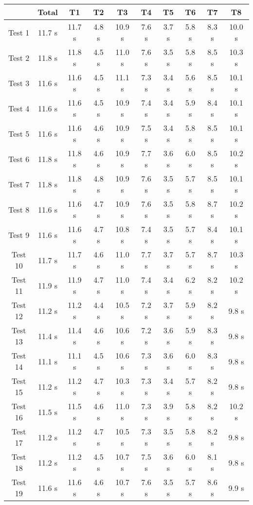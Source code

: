 \documentclass[12pt]{article}
\begin{document}
\begin{tabular}{ | c | c | c | c | c | c | c | c | c | c | }
  \hline	 & Total & T1 & T2 & T3 & T4 & T5 & T6 & T7 & T8 \\ \hline 
  Test 1& 11.7 s& 11.7 s& 4.8 s& 10.9 s& 7.6 s& 3.7 s& 5.8 s& 8.3 s& 10.0 s\\ \hline 
  Test 2& 11.8 s& 11.8 s& 4.5 s& 11.0 s& 7.6 s& 3.5 s& 5.8 s& 8.5 s& 10.3 s\\ \hline 
  Test 3& 11.6 s& 11.6 s& 4.5 s& 11.1 s& 7.3 s& 3.4 s& 5.6 s& 8.5 s& 10.1 s\\ \hline 
  Test 4& 11.6 s& 11.6 s& 4.5 s& 10.9 s& 7.4 s& 3.4 s& 5.9 s& 8.4 s& 10.1 s\\ \hline 
  Test 5& 11.6 s& 11.6 s& 4.6 s& 10.9 s& 7.5 s& 3.4 s& 5.8 s& 8.5 s& 10.1 s\\ \hline 
  Test 6& 11.8 s& 11.8 s& 4.6 s& 10.9 s& 7.7 s& 3.6 s& 6.0 s& 8.5 s& 10.2 s\\ \hline 
  Test 7& 11.8 s& 11.8 s& 4.8 s& 10.9 s& 7.6 s& 3.5 s& 5.7 s& 8.5 s& 10.1 s\\ \hline 
  Test 8& 11.6 s& 11.6 s& 4.7 s& 10.9 s& 7.6 s& 3.5 s& 5.8 s& 8.7 s& 10.2 s\\ \hline 
  Test 9& 11.6 s& 11.6 s& 4.7 s& 10.8 s& 7.4 s& 3.5 s& 5.7 s& 8.4 s& 10.1 s\\ \hline 
  Test 10& 11.7 s& 11.7 s& 4.6 s& 11.0 s& 7.7 s& 3.7 s& 5.7 s& 8.7 s& 10.3 s\\ \hline 
  Test 11& 11.9 s& 11.9 s& 4.7 s& 11.0 s& 7.4 s& 3.4 s& 6.2 s& 8.2 s& 10.2 s\\ \hline 
  Test 12& 11.2 s& 11.2 s& 4.4 s& 10.5 s& 7.2 s& 3.7 s& 5.9 s& 8.2 s& 9.8 s\\ \hline 
  Test 13& 11.4 s& 11.4 s& 4.6 s& 10.6 s& 7.2 s& 3.6 s& 5.9 s& 8.3 s& 9.8 s\\ \hline 
  Test 14& 11.1 s& 11.1 s& 4.5 s& 10.6 s& 7.3 s& 3.6 s& 6.0 s& 8.3 s& 9.8 s\\ \hline 
  Test 15& 11.2 s& 11.2 s& 4.7 s& 10.3 s& 7.3 s& 3.4 s& 5.7 s& 8.2 s& 9.8 s\\ \hline 
  Test 16& 11.5 s& 11.5 s& 4.6 s& 11.0 s& 7.3 s& 3.9 s& 5.8 s& 8.2 s& 10.2 s\\ \hline 
  Test 17& 11.2 s& 11.2 s& 4.7 s& 10.5 s& 7.3 s& 3.5 s& 5.8 s& 8.2 s& 9.8 s\\ \hline 
  Test 18& 11.2 s& 11.2 s& 4.5 s& 10.7 s& 7.5 s& 3.6 s& 6.0 s& 8.1 s& 9.8 s\\ \hline 
  Test 19& 11.6 s& 11.6 s& 4.6 s& 10.7 s& 7.6 s& 3.5 s& 5.7 s& 8.6 s& 9.9 s\\ \hline 

\end{tabular}
\end{document}
